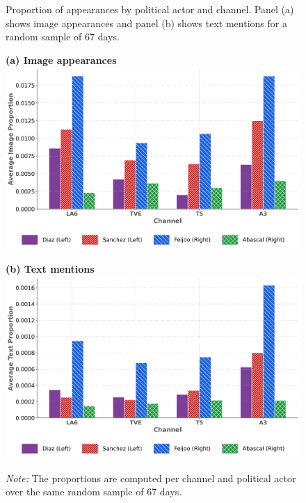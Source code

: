 \documentclass[12pt]{article}
\begin{document}
\begin{figure}[htbp!]
	\centering
	\caption{Proportion of appearances by political actor and channel. Panel (a) shows image appearances and panel (b) shows text mentions for a random sample of 67 days.}
	
	\begin{minipage}{0.48\textwidth}
		\centering
		\textbf{(a) Image appearances}\\[1ex]
		\includegraphics[width=\linewidth]{figures/politicians_image_proportions}
	\end{minipage}%
	\hfill
	\begin{minipage}{0.48\textwidth}
		\centering
		\textbf{(b) Text mentions}\\[1ex]
		\includegraphics[width=\linewidth]{figures/politicians_text_proportions}
	\end{minipage}
	
	\vspace{1ex}
	
\caption*{\small
		\textit{Note:} The proportions are computed per channel and political actor over the same random sample of 67 days.}
	\label{fig:combined_channel}
\end{figure}
\end{document}
